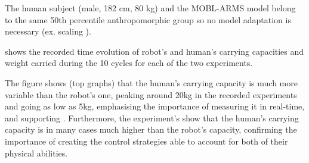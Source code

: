 The human subject (male, 182 cm, 80 kg) and the MOBL-ARMS model belong to the same 50th percentile anthropomorphic group \cite{gordon1989anthropometric} so no model adaptation is necessary (ex. scaling \cite{correa20112782}).

 shows the recorded time evolution of robot's and human's carrying capacities and weight carried during the 10 cycles for each of the two experiments. 

The figure shows (top graphs) that the human's carrying capacity is much more variable than the robot's one, peaking around 20kg in the recorded experiments and going as low as 5kg, emphasising the importance of measuring it in real-time, and supporting . Furthermore, the experiment's show that the human's carrying capacity is in many cases much higher than the robot's capacity, confirming the importance of creating the control strategies able to account for both of their physical abilities. 


